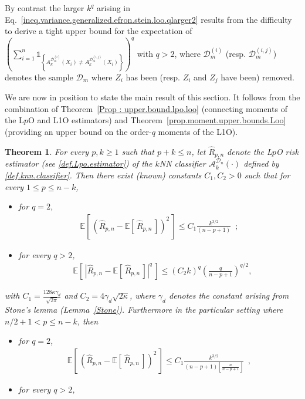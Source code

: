 \documentclass[twoside,11pt]{article}
\numberwithin{equation}{section}
\newcommand{\ga}[1]{\left\{#1\right\}}
\newcommand{\floor}[1]{\left\lfloor #1 \right\rfloor}
\newcommand{\1}{\mathds{1}}%
\newcommand{\ind}[1]{\1_{\ga{#1}}}%
\newcommand{\paren}[1]{\left( #1 \right)}
\newcommand{\croch}[1]{\left[\, #1 \,\right]}
\newcommand{\abs}[1]{\left\lvert #1 \right\rvert} %
\newcommand{\E}{\mathbb{E}}
\newcommand{\Rh}{\widehat{R}}
\newcommand{\D}{\mathcal{D}}
\newcommand{\Dn}{\mathcal{D}_n}
\newcommand{\A}{\mathcal{A}}
\numberwithin{equation}{section}
\theoremstyle{plain}
\newtheorem{thm}{Theorem}[section]
\begin{document}
By contrast the larger $k^q$ arising in Eq.~\eqref{ineq.variance.generalized.efron.stein.loo.qlarger2} results from the difficulty to derive a tight upper bound for the expectation of $ (\sum_{i =1}^n \ind{ A_k^{\D_m^{(i)}}\paren{X_i} \neq A_k^{\D_m^{(i,j)}}\paren{X_i} }  )^q$ with $q>2$, where $\D_m^{(i)}$ (resp. $\D_m^{(i,j)}$) denotes the sample $\D_m$ where $Z_i$ has been (resp. $Z_i$ and $Z_j$ have been) removed.


\bigskip

We are now in position to state the main result of this section.
%
It follows from the combination of Theorem~\ref{Prop : upper.bound.lpo.loo} (connecting moments of the L$p$O and L1O estimators) and Theorem~\ref{prop.moment.upper.bounds.Loo} (providing an upper bound on the order-$q$ moments of the L1O).
%
\begin{thm}\label{prop.moment.upper.bounds.Lpo} For every $p,k\geq 1$  such that $p+k \leq n$, let $\Rh_{p,n}$ denote the L$p$O risk estimator (see \eqref{def.Lpo.estimator}) of the $k$NN classifier $ \A_k^{\Dn}\paren{\cdot}$ defined by \eqref{def.knn.classifier}.
%
Then there exist (known) constants $C_1,C_2>0$ such that for every $1\leq p\leq n-k$,
\begin{itemize}
    \item for $q=2$,
    \begin{eqnarray}\label{ineq.variance.generalized.efron.stein}
    \E\croch{ \paren{\Rh_{p,n} - \E\croch{\Rh_{p,n}} }^2}  \leq   C_1  \frac{ k^{3/2}}{ (n-p+1) }   \enspace ;
    \end{eqnarray}
    \item for every $q>2$,
        \begin{eqnarray}\label{ineq.p.small.generalized.efron.stein}
        & \E\croch{ \abs{ \Rh_{p,n} - \E\croch{\Rh_{p,n}} }^{q} }
        \leq   \paren{C_2 k}^q \paren{ \frac{q}{n-p+1}  }^{q/2}   ,
        \end{eqnarray}
\end{itemize}
with $C_1 =  \frac{128\kappa\gamma_d}{\sqrt{2\pi}}$ and $C_2 = 4\gamma_d\sqrt{2\kappa}$, where $\gamma_d$ denotes the constant arising from Stone's lemma (Lemma~\ref{Stone}).
%
Furthermore in the particular setting where $n/2+1 < p \leq n-k$, then
    \begin{itemize}
        \item  for $q=2$,
    \begin{eqnarray}\label{ineq.p.large.variance.generalized.efron.stein}
    \E\croch{ \paren{\Rh_{p,n} - \E\croch{\Rh_{p,n}} }^2}  \leq   C_1  \frac{ k^{3/2} }{ (n-p+1)\floor{ \frac{n}{n-p+1} } }  \enspace ,
    \end{eqnarray}
%
    \item for every $q>2$,


\end{itemize}
\end{thm}
\end{document}
